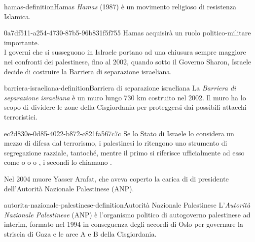 \documentclass[preview]{standalone}
\begin{document}
\begin{snippetdefinition}{hamas-definition}{Hamas}
    \textit{Hamas} (1987) è un movimento religioso di resistenza Islamica.
\end{snippetdefinition}

\begin{snippet}{0a7df511-a254-4730-87b5-96b831f5f755}
    Hamas acquisirà un ruolo politico-militare importante.
    \\
    I governi che si susseguono in Islraele portano ad una chiusura sempre maggiore
    nei confronti dei palestinese, fino al 2002, quando sotto il Governo
    Sharon, Israele decide di costruire la Barriera di separazione israeliana.
\end{snippet}

\begin{snippetdefinition}{barriera-israeliana-definition}{Barriera di separazione israeliana}
    La \textit{Barriera di separazione israeliana} è un muro lungo 730 km costruito nel 2002.
    Il muro ha lo scopo di dividere le zone della Cisgiordania per proteggersi
    dai possibili attacchi terroristici.
\end{snippetdefinition}

\begin{snippet}{ec2d830e-0d85-4022-b872-c821fa567c7c}
    Se lo Stato di Israele lo considera un mezzo di difesa dal terrorismo,
    i palestinesi lo ritengono uno strumento di segregazione razziale,
    tantoché, mentre il primo si riferisce ufficialmente ad esso come
     o  o
     o ,
    i secondi lo chiamano .
    
    Nel 2004 muore Yasser Arafat, che aveva coperto la carica di
    di presidente dell'Autorità Nazionale Palestinese (ANP).
\end{snippet}

\begin{snippetdefinition}{autorita-nazionale-palestinese-definition}{Autorità Nazionale Palestinese}
    L'\textit{Autorità Nazionale Palestinese} (ANP) è
    l'organismo politico di autogoverno palestinese ad interim,
    formato nel 1994 in conseguenza degli accordi di Oslo
    per governare la striscia di Gaza e le aree A e B della Cisgiordania. 
\end{snippetdefinition}

\end{document}
